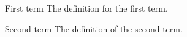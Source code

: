  \label{chap:glossary}

\begin{description*}
\item[First term] The definition for the first term.
\item[Second term] The definition of the second term.
\end{description*}



